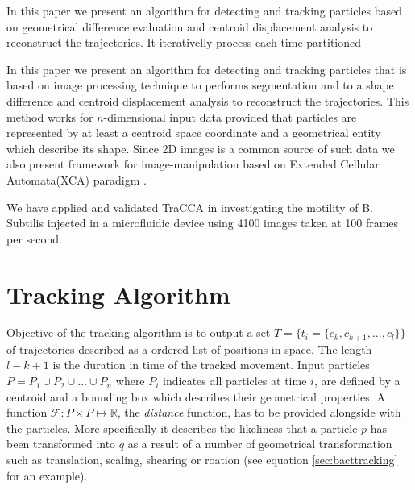\documentclass[conference]{IEEEtran}
\begin{document}
 In this paper we present an algorithm for detecting and tracking particles based on geometrical difference evaluation and centroid displacement analysis to reconstruct the trajectories. It iterativelly process each time partitioned  

In this paper we present an algorithm for detecting and tracking particles that is based on image processing technique to performs segmentation and to a shape difference and centroid displacement analysis to reconstruct the trajectories. 
This method works for $n$-dimensional input data provided that particles are represented by at least a centroid space coordinate and a geometrical entity which describe its shape. 
Since 2D images is a common source of such data we also present framework for image-manipulation based on Extended Cellular Automata(XCA) paradigm .

We have applied and validated TraCCA in investigating the motility of B. Subtilis injected in a microfluidic device using 4100 images taken at 100 frames per second. 



\section{Tracking Algorithm}
Objective of the tracking algorithm is to output a set $T=\{t_i=\{c_k,c_{k+1},\ldots,c_l\}\}$ of trajectories  described as a ordered list of positions in space. The length $l-k+1$ is the duration in time of the tracked movement. 
Input particles $P=P_1 \cup P_2 \cup \ldots \cup P_n$ where $P_i$ indicates all particles at time $i$, are defined by a centroid and a bounding box which describes their geometrical properties. A function $\mathcal{F} :  P \times P \mapsto \mathbb{R}$, the \textit{distance} function, has to be provided alongside with the particles. More specifically it describes the likeliness that a particle $p$ has been transformed into $q$ as a result of a number of geometrical transformation such as translation, scaling, shearing or roation (see equation \ref{sec:bacttracking} for an example). 
\end{document}
